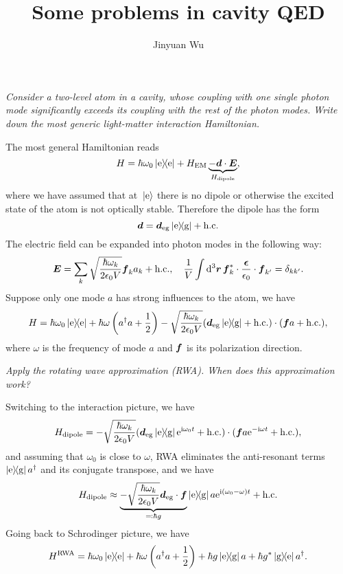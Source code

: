 \documentclass[hyperref, a4paper]{article}
\title{Some problems in cavity QED}
\author{Jinyuan Wu}
\newcommand*{\ii}{\mathrm{i}}
\newcommand*{\ee}{\mathrm{e}}
\newcommand*{\kete}{\ket*{\text{e}}}
\newcommand*{\dyade}{\dyad{\text{e}}}
\newcommand*{\dyadeg}{\dyad{\text{e}}{\text{g}}}
\newcommand*{\dyadge}{\dyad{\text{g}}{\text{e}}}
\newcommand*{\dieg}{\vb*{d}_{\text{eg}}}
\begin{document}
\maketitle

\textit{Consider a two-level atom in a cavity, 
whose coupling with one single photon mode significantly exceeds its coupling with the rest of the photon modes.
Write down the most generic light-matter interaction Hamiltonian.}

The most general Hamiltonian reads 
\begin{equation}
    H = \hbar \omega_0 \dyade + H_{\text{EM}} \underbrace{- \vb*{d} \cdot \vb*{E}}_{H_{\text{dipole}}},
\end{equation} 
where we have assumed that at $\kete$ there is no dipole 
or otherwise the excited state of the atom is not optically stable.
Therefore the dipole has the form 
\begin{equation}
    \vb*{d} = \dieg \dyadeg + \text{h.c.}
\end{equation}
The electric field can be expanded into photon modes in the following way:
\begin{equation}
    \vb*{E} = \sum_k \sqrt{\frac{\hbar \omega_k}{2 \epsilon_0 V}} \vb*{f}_k a_k + \text{h.c.}, \quad 
    \frac{1}{V} \int \dd[3]{\vb*{r}} \vb*{f}_k^* \cdot \frac{\vb*{\epsilon}}{\epsilon_0} \cdot \vb*{f}_{k'} = \delta_{kk'}.
\end{equation}
Suppose only one mode $a$ has strong influences to the atom, we have 
\begin{equation}
    H = \hbar \omega_0 \dyade + \hbar \omega \left( a^\dag a + \frac{1}{2} \right) 
    - \sqrt{\frac{\hbar \omega_k}{2 \epsilon_0 V}} (\dieg \dyadeg + \text{h.c.}) \cdot (\vb*{f} a + \text{h.c.}) ,
\end{equation}
where $\omega$ is the frequency of mode $a$ and $\vb*{f}$ is its polarization direction.

\textit{Apply the rotating wave approximation (RWA). 
When does this approximation work?}

Switching to the interaction picture, we have 
\begin{equation}
    H_{\text{dipole}} = - \sqrt{\frac{\hbar \omega_k}{2 \epsilon_0 V}} 
    (\dieg \dyadeg \ee^{\ii \omega_0 t} + \text{h.c.}) \cdot (\vb*{f} a \ee^{- \ii \omega t} + \text{h.c.}) ,
\end{equation}
and assuming that $\omega_0$ is close to $\omega$, RWA eliminates the anti-resonant terms 
$\dyadeg a^\dag$ and its conjugate transpose, and we have 
\begin{equation}
    H_{\text{dipole}} \approx \underbrace{- \sqrt{\frac{\hbar \omega_k}{2 \epsilon_0 V}} \dieg \cdot \vb*{f} }_{\eqqcolon \hbar g}
    \dyadeg a \ee^{\ii (\omega_0 - \omega) t} + \text{h.c.}
\end{equation}
Going back to Schrodinger picture, we have 
\begin{equation}
    H^{\text{RWA}} = \hbar \omega_0 \dyade + \hbar \omega \left( a^\dag a + \frac{1}{2} \right) + \hbar g \dyadeg a + \hbar g^* \dyadge a^\dag. 
\end{equation}
\end{document}
